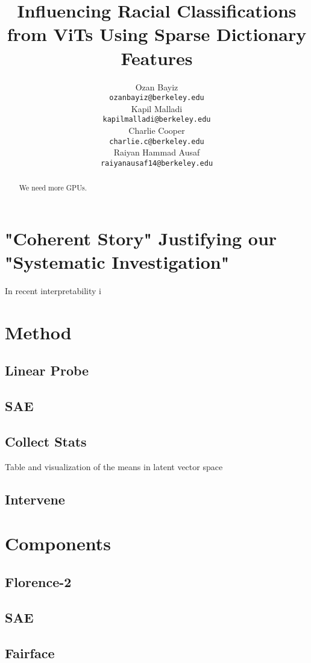 \documentclass{article}
\title{Influencing Racial Classifications from ViTs Using Sparse Dictionary Features}
\author{ Ozan Bayiz \\
	\texttt{ozanbayiz@berkeley.edu} \\
	\And
	Kapil Malladi \\
	\texttt{kapilmalladi@berkeley.edu} \\
	\AND
	Charlie Cooper \\
	\texttt{charlie.c@berkeley.edu} \\
	\And
	Raiyan Hammad Ausaf \\
	\texttt{raiyanausaf14@berkeley.edu} \\
}
\begin{document}
\maketitle

\begin{abstract}
We need more GPUs.
\end{abstract}


\section{"Coherent Story" Justifying our "Systematic Investigation"}
In recent interpretability i




\section{Method}
\subsection{Linear Probe}
\subsection{SAE}
\subsection{Collect Stats}
Table and visualization of the means in latent vector space
\subsection{Intervene}


\section{Components}
\subsection{Florence-2}
\subsection{SAE}
\subsection{Fairface}




\end{document}
